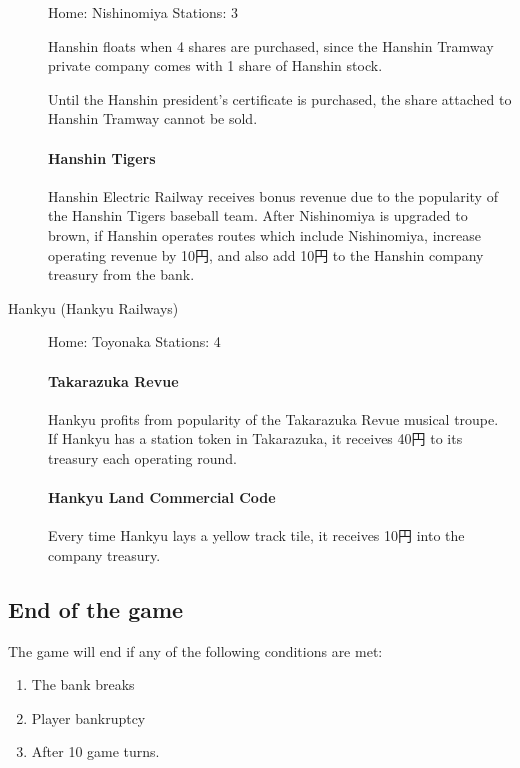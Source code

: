 \documentclass{article}
\begin{document}
\begin{CJK}{UTF8}{min}
\begin{multicols}{2}
\begin{description}
Home: Nishinomiya \hfill Stations: 3

Hanshin floats when 4 shares are purchased, since the Hanshin Tramway
private company comes with 1 share of Hanshin stock.

Until the Hanshin president's certificate is purchased, the share
attached to Hanshin Tramway cannot be sold.

\paragraph{Hanshin Tigers}
Hanshin Electric Railway receives bonus revenue due to the popularity
of the Hanshin Tigers baseball team. After Nishinomiya is upgraded to
brown, if Hanshin operates routes which include Nishinomiya, increase
operating revenue by 10円, and also add 10円 to the Hanshin company
treasury from the bank.

\item[Hankyu (Hankyu Railways)] \hfill

Home: Toyonaka \hfill
Stations: 4

\paragraph{Takarazuka Revue}
Hankyu profits from popularity of the Takarazuka Revue musical
troupe. If Hankyu has a station token in Takarazuka, it receives
40円 to its treasury each operating round.


\paragraph{Hankyu Land Commercial Code}
Every time Hankyu lays a yellow track tile, it receives 10円 into the
company treasury.

\end{description}

\subsection{End of the game}

The game will end if any of the following conditions are met:
\begin{enumerate}
\item The bank breaks

\item Player bankruptcy

\item After 10 game turns.
\end{enumerate}


\end{multicols}
\end{CJK}
\end{document}
